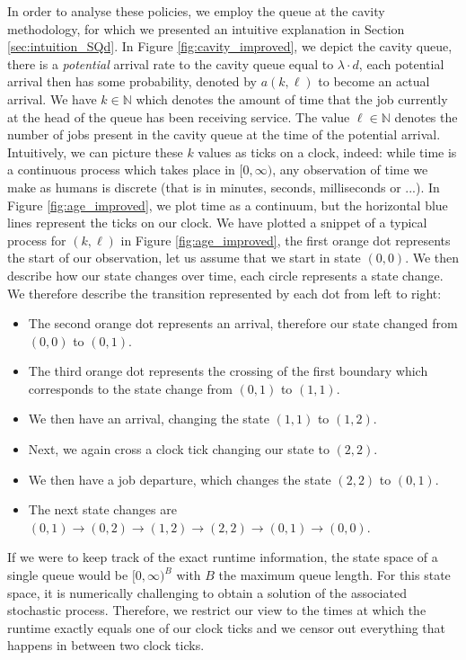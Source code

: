 \documentclass[12pt]{report}
\begin{document}
In order to analyse these policies, we employ the queue at the cavity methodology, for which we presented an intuitive explanation in Section \ref{sec:intuition_SQd}. In Figure \ref{fig:cavity_improved}, we depict the cavity queue, there is a \textit{potential} arrival rate to the cavity queue equal to $\lambda \cdot d$, each potential arrival then has some probability, denoted by $a(k,\ell)$ to become an actual arrival. We have $k \in \mathbb{N}$ which denotes the amount of time that the job currently at the head of the queue has been receiving service. The value $\ell \in \mathbb{N}$ denotes the number of jobs present in the cavity queue at the time of the potential arrival. Intuitively, we can picture these $k$ values as ticks on a clock, indeed: while time is a continuous process which takes place in $[0,\infty)$, any observation of time we make as humans is discrete (that is in minutes, seconds, milliseconds or ...). In Figure \ref{fig:age_improved}, we plot time as a continuum, but the horizontal blue lines represent the ticks on our clock. We have plotted a snippet of a typical process for $(k,\ell)$ in Figure \ref{fig:age_improved}, the first orange dot represents the start of our observation, let us assume that we start in state $(0,0)$. We then describe how our state changes over time, each circle represents a state change. We therefore describe the transition represented by each dot from left to right:
\begin{itemize}
	\item The second orange dot represents an arrival, therefore our state changed from $(0,0)$ to $(0,1)$.
	\item The third orange dot represents the crossing of the first boundary which corresponds to the state change from $(0,1)$ to $(1,1)$.
	\item We then have an arrival, changing the state $(1,1)$ to $(1,2)$.
	\item Next, we again cross a clock tick changing our state to $(2,2)$.
	\item We then have a job departure, which changes the state $(2,2)$ to $(0,1)$.
	\item The next state changes are $(0,1) \rightarrow (0,2) \rightarrow (1,2) \rightarrow (2,2) \rightarrow (0, 1) \rightarrow (0,0)$.
\end{itemize}

If we were to keep track of the exact runtime information, the state space of a single queue would be $[0,\infty)^B$ with $B$ the maximum queue length. For this state space, it is numerically challenging to obtain a solution of the associated stochastic process. Therefore, we restrict our view to the times at which the runtime exactly equals one of our clock ticks and we censor out everything that happens in between two clock ticks. 
\end{document}
